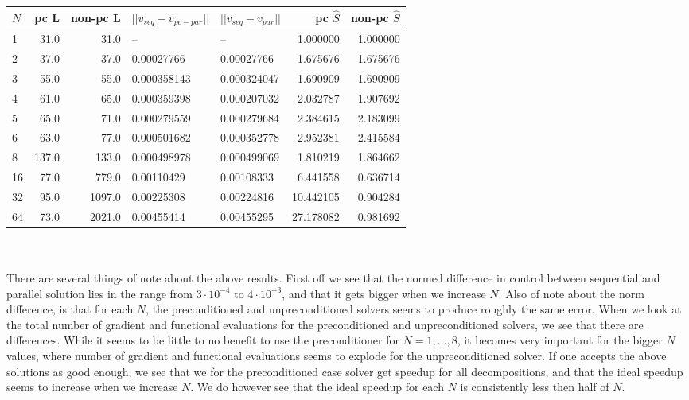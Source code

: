 \begin{tabular}{lrrllrr}
\toprule
{}$N$ &  pc L &  non-pc L &       $||v_{seq}-v_{pc-par}||$ &  $||v_{seq}-v_{par}||$  &  pc $\hat{S}$ &  non-pc $\hat{S}$ \\
\midrule
1  &     31.0 &      31.0 &           -- &           -- &    1.000000 &        1.000000 \\
2  &     37.0 &      37.0 &   0.00027766 &   0.00027766 &    1.675676 &        1.675676 \\
3  &     55.0 &      55.0 &  0.000358143 &  0.000324047 &    1.690909 &        1.690909 \\
4  &     61.0 &      65.0 &  0.000359398 &  0.000207032 &    2.032787 &        1.907692 \\
5  &     65.0 &      71.0 &  0.000279559 &  0.000279684 &    2.384615 &        2.183099 \\
6  &     63.0 &      77.0 &  0.000501682 &  0.000352778 &    2.952381 &        2.415584 \\
8  &    137.0 &     133.0 &  0.000498978 &  0.000499069 &    1.810219 &        1.864662 \\
16 &     77.0 &     779.0 &   0.00110429 &   0.00108333 &    6.441558 &        0.636714 \\
32 &     95.0 &    1097.0 &   0.00225308 &   0.00224816 &   10.442105 &        0.904284 \\
64 &     73.0 &    2021.0 &   0.00455414 &   0.00455295 &   27.178082 &        0.981692 \\
\bottomrule
\end{tabular}
\\
\\
There are several things of note about the above results. First off we see that the normed difference in control between sequential and parallel solution lies in the range from $3\cdot 10^{-4}$ to $4\cdot 10^{-3}$, and that it gets bigger when we increase $N$. Also of note about the norm difference, is that for each $N$, the preconditioned and unpreconditioned solvers seems to produce roughly the same error. When we look at the total number of gradient and functional evaluations for the preconditioned and unpreconditioned solvers, we see that there are differences. While it seems to be little to no benefit to use the preconditioner for $N=1,...,8$, it becomes very important for the bigger $N$ values, where number of gradient and functional evaluations seems to explode for the unpreconditioned solver. If one accepts the above solutions as good enough, we see that we for the preconditioned case solver get speedup for all decompositions, and that the ideal speedup seems to increase when we increase $N$. We do however see that the ideal speedup for each $N$ is consistently less then half of $N$.
